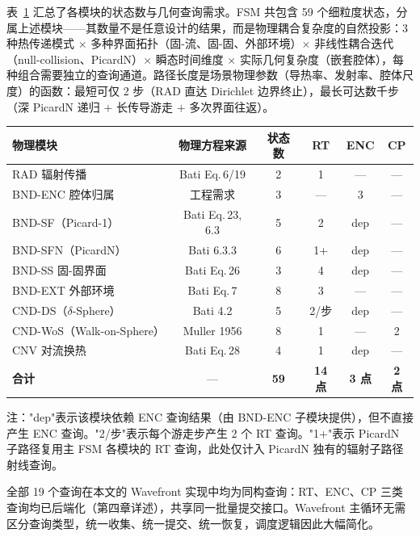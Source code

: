 表~\ref{tab:module-summary} 汇总了各模块的状态数与几何查询需求。FSM 共包含 59 个细粒度状态，分属上述模块——其数量不是任意设计的结果，而是物理耦合复杂度的自然投影：3 种热传递模式 $\times$ 多种界面拓扑（固-流、固-固、外部环境）$\times$ 非线性耦合迭代（null-collision、PicardN）$\times$ 瞬态时间维度 $\times$ 实际几何复杂度（嵌套腔体），每种组合需要独立的查询通道。路径长度是场景物理参数（导热率、发射率、腔体尺度）的函数：最短可仅 2 步（RAD 直达 Dirichlet 边界终止），最长可达数千步（深 PicardN 递归 $+$ 长传导游走 $+$ 多次界面往返）。

\begin{table}[htbp]
  \centering
  \label{tab:module-summary}
  \small
  \begin{tabular}{lccccc}
    \toprule
    物理模块 & 物理方程来源 & 状态数 & RT & ENC & CP \\
    \midrule
    RAD 辐射传播 & Bati Eq.\,6/19 & 2 & 1 & — & — \\
    BND-ENC 腔体归属 & 工程需求 & 3 & — & 3 & — \\
    BND-SF（Picard-1） & Bati Eq.\,23, 6.3 & 5 & 2 & dep & — \\
    BND-SFN（PicardN） & Bati 6.3.3 & 6 & 1+ & dep & — \\
    BND-SS 固-固界面 & Bati Eq.\,26 & 3 & 4 & dep & — \\
    BND-EXT 外部环境 & Bati Eq.\,7 & 8 & 3 & — & — \\
    CND-DS（$\delta$-Sphere） & Bati 4.2 & 5 & 2/步 & dep & — \\
    CND-WoS（Walk-on-Sphere） & Muller 1956 & 8 & 1 & — & 2 \\
    CNV 对流换热 & Bati Eq.\,28 & 4 & 1 & dep & — \\
    \midrule
    \textbf{合计} & — & \textbf{59} & \textbf{14 点} & \textbf{3 点} & \textbf{2 点} \\
    \bottomrule
  \end{tabular}

  \vspace{4pt}
  {\raggedright\footnotesize 注："dep"表示该模块依赖 ENC 查询结果（由 BND-ENC 子模块提供），但不直接产生 ENC 查询。"2/步"表示每个游走步产生 2 个 RT 查询。"1+"表示 PicardN 子路径复用主 FSM 各模块的 RT 查询，此处仅计入 PicardN 独有的辐射子路径射线查询。\par}
\end{table}

全部 19 个查询在本文的 Wavefront 实现中均为同构查询：RT、ENC、CP 三类查询均已后端化（第四章详述），共享同一批量提交接口。Wavefront 主循环无需区分查询类型，统一收集、统一提交、统一恢复，调度逻辑因此大幅简化。

